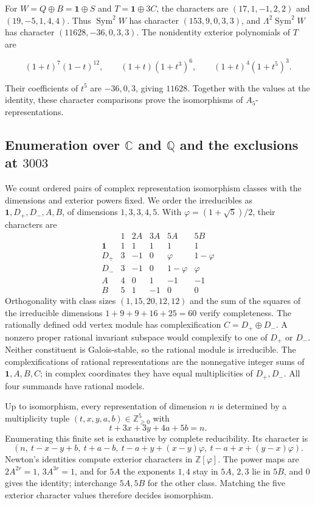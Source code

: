 \documentclass[11pt,a4paper]{article}
\begin{document}
For \(W=Q\oplus B=\mathbf1\oplus S\) and \(T=\mathbf1\oplus3C\), the characters are \((17,1,-1,2,2)\) and \((19,-5,1,4,4)\). Thus \(\operatorname{Sym}^2W\) has character \((153,9,0,3,3)\), and \(\Lambda^2\operatorname{Sym}^2W\) has character \((11628,-36,0,3,3)\). The nonidentity exterior polynomials of \(T\) are

\[
(1+t)^7(1-t)^{12},\qquad(1+t)(1+t^3)^6,\qquad(1+t)^4(1+t^5)^3.
\]

Their coefficients of \(t^5\) are \(-36,0,3\), giving \(11628\). Together with the values at the identity, these character comparisons prove the isomorphisms of $A_5$-representations.

\subsection{Enumeration over $\mathbb C$ and $\mathbb Q$ and the exclusions at $3003$}\label{subsec:A4}

We count ordered pairs of complex representation isomorphism classes with the dimensions and exterior powers fixed. We order the irreducibles as $\mathbf1,D_+,D_-,A,B$, of dimensions $1,3,3,4,5$. With $\varphi=(1+\sqrt5)/2$, their characters are
\[
\begin{array}{c|rrrrr}
&1&2A&3A&5A&5B\\\hline
\mathbf1&1&1&1&1&1\\
D_+&3&-1&0&\varphi&1-\varphi\\
D_-&3&-1&0&1-\varphi&\varphi\\
A&4&0&1&-1&-1\\
B&5&1&-1&0&0
\end{array}
\]
Orthogonality with class sizes $(1,15,20,12,12)$ and the sum of the squares of the irreducible dimensions $1+9+9+16+25=60$ verify completeness. The rationally defined odd vertex module has complexification $C=D_+\oplus D_-$. A nonzero proper rational invariant subspace would complexify to one of $D_+$ or $D_-$. Neither constituent is Galois-stable, so the rational module is irreducible. The complexifications of rational representations are the nonnegative integer sums of $\mathbf1,A,B,C$; in complex coordinates they have equal multiplicities of $D_+,D_-$. All four summands have rational models.

Up to isomorphism, every representation of dimension $n$ is determined by a multiplicity tuple $(t,x,y,a,b)\in\mathbb Z_{\geq0}^5$ with
\[
t+3x+3y+4a+5b=n.
\]
Enumerating this finite set is exhaustive by complete reducibility. Its character is
\[
(n,\ t-x-y+b,\ t+a-b,\ t-a+y+(x-y)\varphi,\ t-a+x+(y-x)\varphi).
\]
Newton's identities compute exterior characters in $\mathbb Z[\varphi]$. The power maps are $2A^{2r}=1$, $3A^{3r}=1$, and for $5A$ the exponents $1,4$ stay in $5A$, $2,3$ lie in $5B$, and $0$ gives the identity; interchange $5A,5B$ for the other class. Matching the five exterior character values therefore decides isomorphism.
\end{document}
